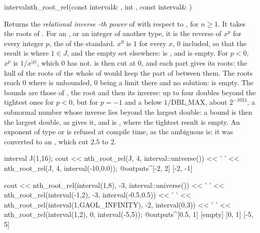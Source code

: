 \begin{deffun}{interval}{nth\_root\_rel}{(const interval\& , int , const interval\& )}
  \begin{operation}
  \end{operation}
  Returns the \emph{relational inverse -th power} of  with
  respect to , for $n\geq1$. It takes the roots of
  .\newinvfive{} For an  , or an integer
  of another type, it is the reverse of $x^p$ for every integer $p$, the
   of the standard. $x^0$ is $1$ for every $x$, $0$ included,
  so that the result is  where $1\in J$, and the empty set elsewhere:
   is , and
   is empty. For $p<0$, $x^p$ is
  $1/x^{|p|}$, which $0$ has not.  is then cut at $0$, and each part
  gives its roots: the hull of the roots of the whole of  would keep
  the part of  between them. The roots reach $0$ where  is
  unbounded, $0$ being a limit there and no solution:
   is empty. The
  bounds are those of , the root and then its inverse:
  up to four doubles beyond the tightest ones for $p<0$, but for $p=-1$ and a
   below $1/\text{DBL\_MAX}$, about $2^{-1024}$, a subnormal number
  whose inverse lies beyond the largest double: a
  bound is then the largest double, as  gives it, and
  is , where the tightest result is
  empty. An exponent of type
   or  is refused at compile time, as the ambiguous
   is: it was converted to an ,
  which cut $2.5$ to $2$.
\begin{example}
interval J(1,16);
cout << nth_root_rel(J, 4, interval::universe()) << ' '
     << nth_root_rel(J, 4, interval(-10,0.0));
@outputs^[-2, 2] [-2, -1]~
\end{example}
\begin{example}
cout << nth_root_rel(interval(1,8), -3, interval::universe()) << ' '
     << nth_root_rel(interval(-1,2), -3, interval(-0.5,0.5)) << ' '
     << nth_root_rel(interval(1,GAOL_INFINITY), -2, interval(0,3)) << ' '
     << nth_root_rel(interval(1,2), 0, interval(-5,5));
@outputs^[0.5, 1] [empty] [0, 1] [-5, 5]~
\end{example}
\end{deffun}

